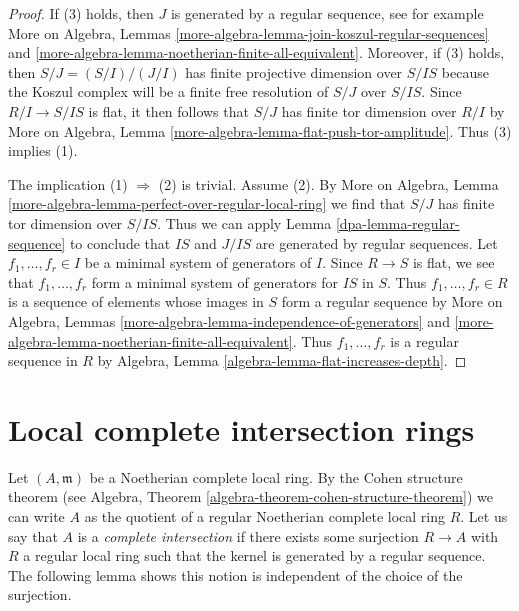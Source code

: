 \begin{proof}

If (3) holds, then $J$ is generated by a regular sequence, see for example
More on Algebra, Lemmas
\ref{more-algebra-lemma-join-koszul-regular-sequences} and
\ref{more-algebra-lemma-noetherian-finite-all-equivalent}.
Moreover, if (3) holds, then $S/J = (S/I)/(J/I)$
has finite projective dimension over $S/IS$ because the Koszul
complex will be a finite free resolution of $S/J$ over $S/IS$.
Since $R/I \to S/IS$ is flat, it then follows that $S/J$ has finite
tor dimension over $R/I$ by
More on Algebra, Lemma \ref{more-algebra-lemma-flat-push-tor-amplitude}.
Thus (3) implies (1).

\medskip\noindent
The implication (1) $\Rightarrow$ (2) is trivial.
Assume (2). By
More on Algebra, Lemma \ref{more-algebra-lemma-perfect-over-regular-local-ring}
we find that $S/J$ has finite tor dimension over $S/IS$.
Thus we can apply Lemma \ref{dpa-lemma-regular-sequence}
to conclude that $IS$ and $J/IS$ are generated by regular sequences.
Let $f_1, \ldots, f_r \in I$ be a minimal system of generators of $I$.
Since $R \to S$ is flat, we see that $f_1, \ldots, f_r$ form a minimal
system of generators for $IS$ in $S$. Thus $f_1, \ldots, f_r \in R$
is a sequence of elements whose images in $S$ form a regular sequence
by More on Algebra, Lemmas
\ref{more-algebra-lemma-independence-of-generators} and
\ref{more-algebra-lemma-noetherian-finite-all-equivalent}.
Thus $f_1, \ldots, f_r$ is a regular sequence in $R$ by
Algebra, Lemma \ref{algebra-lemma-flat-increases-depth}.
\end{proof}

\section{Local complete intersection rings}
\label{dpa-section-lci}
Let $(A, \mathfrak m)$ be a Noetherian complete local ring.
By the Cohen structure theorem (see
Algebra, Theorem \ref{algebra-theorem-cohen-structure-theorem})
we can write $A$ as the quotient of a regular Noetherian
complete local ring $R$. Let us say that $A$ is a
{\it complete intersection}
if there exists some surjection $R \to A$
with $R$ a regular local ring such that the kernel
is generated by a regular sequence.
The following lemma shows this notion is independent of
the choice of the surjection.

